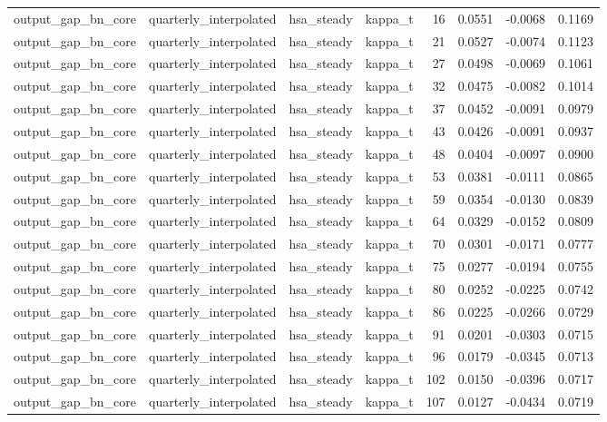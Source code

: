 \begin{tabular}{llllrrrr}
output\_gap\_bn\_core & quarterly\_interpolated & hsa\_steady & kappa\_t & 16 & 0.0551 & -0.0068 & 0.1169 \\
output\_gap\_bn\_core & quarterly\_interpolated & hsa\_steady & kappa\_t & 21 & 0.0527 & -0.0074 & 0.1123 \\
output\_gap\_bn\_core & quarterly\_interpolated & hsa\_steady & kappa\_t & 27 & 0.0498 & -0.0069 & 0.1061 \\
output\_gap\_bn\_core & quarterly\_interpolated & hsa\_steady & kappa\_t & 32 & 0.0475 & -0.0082 & 0.1014 \\
output\_gap\_bn\_core & quarterly\_interpolated & hsa\_steady & kappa\_t & 37 & 0.0452 & -0.0091 & 0.0979 \\
output\_gap\_bn\_core & quarterly\_interpolated & hsa\_steady & kappa\_t & 43 & 0.0426 & -0.0091 & 0.0937 \\
output\_gap\_bn\_core & quarterly\_interpolated & hsa\_steady & kappa\_t & 48 & 0.0404 & -0.0097 & 0.0900 \\
output\_gap\_bn\_core & quarterly\_interpolated & hsa\_steady & kappa\_t & 53 & 0.0381 & -0.0111 & 0.0865 \\
output\_gap\_bn\_core & quarterly\_interpolated & hsa\_steady & kappa\_t & 59 & 0.0354 & -0.0130 & 0.0839 \\
output\_gap\_bn\_core & quarterly\_interpolated & hsa\_steady & kappa\_t & 64 & 0.0329 & -0.0152 & 0.0809 \\
output\_gap\_bn\_core & quarterly\_interpolated & hsa\_steady & kappa\_t & 70 & 0.0301 & -0.0171 & 0.0777 \\
output\_gap\_bn\_core & quarterly\_interpolated & hsa\_steady & kappa\_t & 75 & 0.0277 & -0.0194 & 0.0755 \\
output\_gap\_bn\_core & quarterly\_interpolated & hsa\_steady & kappa\_t & 80 & 0.0252 & -0.0225 & 0.0742 \\
output\_gap\_bn\_core & quarterly\_interpolated & hsa\_steady & kappa\_t & 86 & 0.0225 & -0.0266 & 0.0729 \\
output\_gap\_bn\_core & quarterly\_interpolated & hsa\_steady & kappa\_t & 91 & 0.0201 & -0.0303 & 0.0715 \\
output\_gap\_bn\_core & quarterly\_interpolated & hsa\_steady & kappa\_t & 96 & 0.0179 & -0.0345 & 0.0713 \\
output\_gap\_bn\_core & quarterly\_interpolated & hsa\_steady & kappa\_t & 102 & 0.0150 & -0.0396 & 0.0717 \\
output\_gap\_bn\_core & quarterly\_interpolated & hsa\_steady & kappa\_t & 107 & 0.0127 & -0.0434 & 0.0719 \\

\end{tabular}
